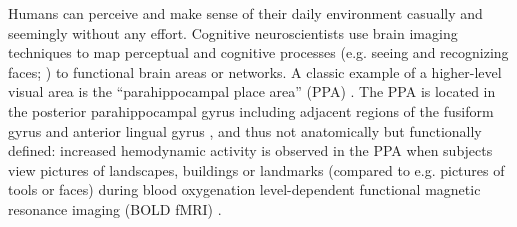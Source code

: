 \documentclass[english]{article}
\begin{document}


Humans can perceive and make sense of their daily environment casually and
seemingly without any effort. Cognitive neuroscientists use brain imaging
techniques to map perceptual and cognitive processes (e.g. seeing and
recognizing faces; \citep{kanwisher1997ffa}) to functional brain areas or
networks.
A classic example of a higher-level visual area is the ``parahippocampal place
area'' (PPA) \citep{epstein1998ppa, epstein1999parahippocampal}.
The PPA is located in the posterior parahippocampal gyrus including adjacent
regions of the fusiform gyrus and anterior lingual gyrus
\citep{epstein2008parahippocampal}, and thus not anatomically but functionally
defined:
increased hemodynamic activity is observed in the PPA when subjects view
pictures of landscapes, buildings or landmarks (compared to e.g. pictures of
tools or faces) during blood oxygenation level-dependent functional magnetic
resonance imaging (BOLD fMRI) \citep{aguirre1998area, epstein2014neural,
epstein1998ppa}.
\end{document}
